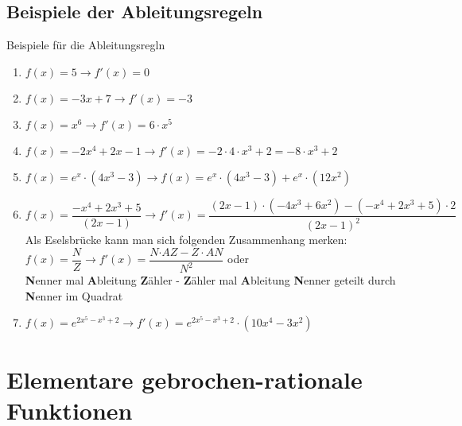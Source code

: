\subsection{Beispiele der Ableitungsregeln}\label{Ableitungen}
\begin{bsp}{Beispiele für die Ableitungsregln}{}
\begin{enumerate}
    \item $f(x) = 5 \longrightarrow f'(x) = 0$
    \item $f(x) = -3x +7 \longrightarrow f'(x) = -3 $
    \item $f(x) = x^6 \longrightarrow f'(x) = 6\cdot x^5$
    \item $f(x) = -2x^4+2x-1 \longrightarrow f'(x) = -2\cdot 4\cdot x^3 + 2 = -8\cdot x^3 +2$
    \item $f(x) = e^x \cdot (4x^3 -3) \longrightarrow f(x) = e^x \cdot (4x^3-3) + e^x \cdot (12x^2)$
    \item $f(x) = \dfrac{-x^4+ 2x^3 + 5 }{(2x-1)} \longrightarrow f'(x) = \dfrac{(2x-1)\cdot (-4x^3+6x^2) - (-x^4 +2x^3 + 5)\cdot 2 }{(2x-1)^2}$ \\[0.2cm]
    Als Eselsbrücke kann man sich folgenden Zusammenhang merken: \\[0.2cm]
    $f(x) = \dfrac{N}{Z} \longrightarrow f'(x) = \dfrac{{N}{\cdot {AZ} -{}Z}\cdot {AN}}{{N}^2}$ oder\\[0.2cm]  {\bfseries\color{red}N}enner mal {\bfseries\color{red}A}bleitung {\bfseries\color{red}Z}ähler - {\bfseries\color{red}Z}ähler mal {\bfseries\color{red}A}bleitung {\bfseries\color{red}N}enner geteilt durch {\bfseries\color{red}N}enner im Quadrat
    \item $f(x)= e^{2x^5-x^3+2 }\longrightarrow f'(x) = e^{2x^5-x^3 + 2} \cdot (10x^4 -3x^2)$
\end{enumerate}
\end{bsp}
\section{Elementare gebrochen-rationale Funktionen} 
